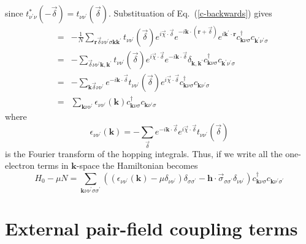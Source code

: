 since $t_{\nu^{\prime}\nu}^*(-\vec{\delta}) = t_{\nu\nu^{\prime}}(\vec{\delta})$.
Substituation of Eq.~(\ref{c-backwards}) gives
\begin{eqnarray}
& = &-\frac{1}{N}
\sum_{\mathbf{r}\vec{\delta}\nu\nu^{\prime}\sigma \mathbf{k}\mathbf{k}^{\prime}}
t_{\nu\nu^{\prime}}(\vec{\delta})e^{i\vec{\chi}\cdot \vec{\delta}} 
e^{-i \mathbf{k}\cdot (\mathbf{r} + \vec{\delta})}
e^{i \mathbf{k}^{\prime} \cdot \mathbf{r}}
     c^{\dagger}_{\mathbf{k}\nu\sigma}
  c_{\mathbf{k}^{\prime}\nu^{\prime}\sigma} \\
& = & - \sum_{\vec{\delta}\nu\nu^{\prime}\mathbf{k},\mathbf{k}^{\prime}}
t_{\nu\nu^{\prime}}(\vec{\delta})e^{i \vec{\chi}\cdot \vec{\delta}} 
 e^{-i \mathbf{k}\cdot \vec{\delta}} \delta_{\mathbf{k},\mathbf{k}^{\prime}}
     c^{\dagger}_{\mathbf{k}\nu\sigma}
  c_{\mathbf{k}^{\prime}\nu^{\prime}\sigma} \\
& = & - \sum_{\mathbf{k}\vec{\delta}\nu\nu^{\prime}}  
e^{-i \mathbf{k}\cdot \vec{\delta}} 
t_{\nu\nu^{\prime}}(\vec{\delta})e^{i \vec{\chi}\cdot\vec{\delta}} 
  c^{\dagger}_{\mathbf{k}\nu\sigma}
  c_{\mathbf{k}\nu^{\prime}\sigma} \\
& = & \sum_{\mathbf{k}\nu\nu^{\prime}} \epsilon_{\nu\nu^{\prime}}(\mathbf{k})
  c^{\dagger}_{\mathbf{k}\nu\sigma}
  c_{\mathbf{k}\nu^{\prime}\sigma}
 \end{eqnarray}
where
\begin{equation}
\epsilon_{\nu\nu^{\prime}}(\mathbf{k}) = - \sum_{\vec{\delta}} 
e^{-i \mathbf{k}\cdot\vec{\delta}} e^{i \vec{\chi}\cdot\vec{\delta}}  
t_{\nu\nu^{\prime}}(\vec{\delta})
\end{equation}
is the Fourier transform of the hopping integrals.
Thus, if we write all the one-electron terms in $\mathbf{k}$-space
the Hamiltonian becomes
\begin{equation}
H_0 - \mu N =  \sum_{\mathbf{k}\nu\nu^{\prime}\sigma\sigma^{\prime}} 
((\epsilon_{\nu\nu^{\prime}}(\mathbf{k}) - \mu\delta_{\nu\nu^{\prime}})
\delta_{\sigma\sigma^{\prime}} -
 \mathbf{h}\cdot\vec{\sigma}_{\sigma\sigma^{\prime}}\delta_{\nu\nu^{\prime}}) 
c^{\dagger}_{\mathbf{k}\nu\sigma}
 c_{\mathbf{k}\nu^{\prime}\sigma^{\prime}} 
\end{equation} 

\section{External pair-field coupling terms}
\label{section:pair-field}

